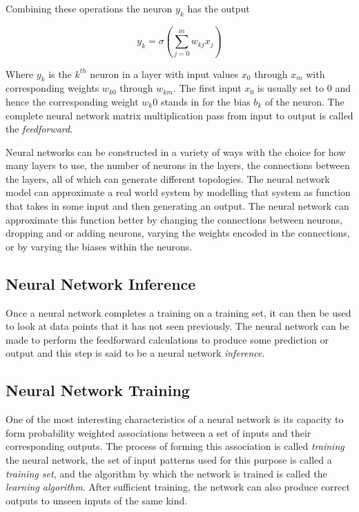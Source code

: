 Combining these operations the neuron $y_k$ has the output

\begin{equation}
	y_k = \sigma \left( \sum_{j=0}^m w_{kj} x_j \right)
\end{equation}

Where $y_k$ is the $k^{th}$ neuron in a layer with input values $x_0$ through $x_m$ with corresponding weights $w_{k0}$ through $w_{km}$. The first input $x_0$ is usually set to $0$ and hence the corresponding weight $w_k0$ stands in for the bias $b_k$ of the neuron. The complete neural network matrix multiplication pass from input to output is called the \textit{feedforward}.

Neural networks can be constructed in a variety of ways with the choice for how many layers to use, the number of neurons in the layers, the connections between the layers, all of which can generate different topologies. The neural network model can approximate a real world system by modelling that system as function that takes in some input and then generating an output. The neural network can approximate this function better by changing the connections between neurons, dropping and or adding neurons, varying the weights encoded in the connections, or by varying the biases within the neurons.

\subsection{Neural Network Inference}

Once a neural network completes a training on a training set, it can then be used to look at data points that it has not seen previously. The neural network can be made to perform the feedforward calculations to produce some prediction or output and this step is said to be a neural network \textit{inference}.

\subsection{Neural Network Training}

One of the most interesting characteristics of a neural network is its capacity to form probability weighted associations between a set of inputs and their corresponding outputs. The process of forming this association is called \textit{training} the neural network, the set of input patterns used for this purpose is called a \textit{training set}, and the algorithm by which the network is trained is called the \textit{learning algorithm}. After sufficient training, the network can also produce correct outputs to unseen inputs of the same kind.

